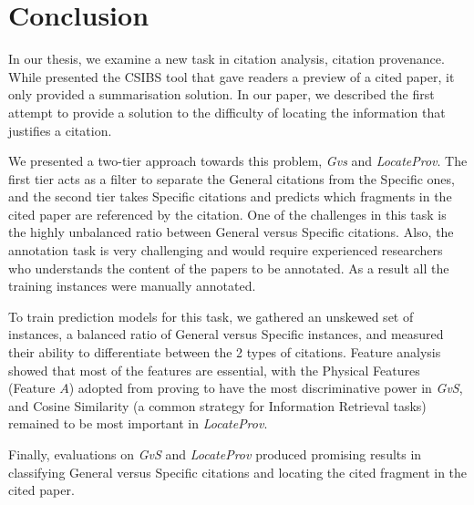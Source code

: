 \chapter{Conclusion}
\label{conclusion}
In our thesis, we examine a new task in citation analysis, citation provenance. 
While  presented the CSIBS tool that gave readers a preview of a cited paper, it only provided a summarisation solution.
In our paper, we described the first attempt to provide a solution to the difficulty of locating the information that justifies a citation.

We presented a two-tier approach towards this problem, {\it Gvs} and {\it LocateProv}. The first tier acts as a filter to separate the General citations from the Specific ones, and the second tier takes Specific citations and predicts which fragments in the cited paper are referenced by the citation. 
One of the challenges in this task is the highly unbalanced ratio between General versus Specific citations. Also, the annotation task is very challenging and would require experienced researchers who understands the content of the papers to be annotated. As a result all the training instances were manually annotated.

To train prediction models for this task, we gathered an unskewed set of instances, a balanced ratio of General versus Specific instances, and measured their ability to differentiate between the 2 types of citations. Feature analysis showed that most of the features are essential, with the Physical Features (Feature $A$) adopted from  proving to have the most discriminative power in {\it GvS}, and Cosine Similarity (a common strategy for Information Retrieval tasks) remained to be most important in {\it LocateProv}.

Finally, evaluations on {\it GvS} and {\it LocateProv} produced promising results in classifying General versus Specific citations and locating the cited fragment in the cited paper.
